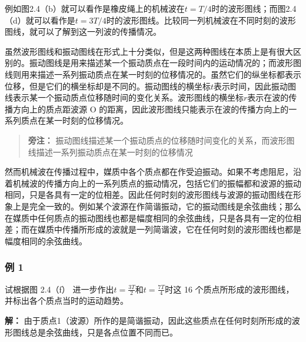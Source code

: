 例如图2.4（b）就可以看作是橡皮绳上的机械波在\(t = T / 4\)时的波形图线；而图2.4（d）就可以看作是\(t = 3T / 4\)时的波形图线。比较同一列机械波在不同时刻的波形图线，就可以了解到这一列波的传播情况。

虽然波形图线和振动图线在形式上十分类似，但是这两种图线在本质上是有很大区别的。振动图线是用来描述某一个振动质点在一段时间内的运动情况的；而波形图线则用来描述一系列振动质点在某一时刻的位移情况的。虽然它们的纵坐标都表示位移，但是它们的横坐标却是不同的。振动图线的横坐标\(t\)表示时间，因此振动图线表示某一个振动质点位移随时间的变化关系。波形图线的横坐标\(r\)表示在波的传播方向上的质点距波源
O
的距离，因此波形图线只能表示在波的传播方向上的一系列质点在某一时刻的位移情况。

\begin{quote}
\textbf{旁注：}
振动图线描述某一个振动质点的位移随时间变化的关系，而波形图线描述一系列振动质点在某一时刻的位移情况
\end{quote}

然而机械波在传播过程中，媒质中各个质点都在作受迫振动。如果不考虑阻尼，沿着机械波的传播方向上的一系列质点的振动情况，包括它们的振幅都和波源的振动相同，只是各具有一定的位相差。因此任何时刻的波形图线与波源的振动图线在形象上是完全一致的。例如某个波源在作简谐振动，它的振动图线是余弦曲线；那么在媒质中任何质点的振动图线也都是幅度相同的余弦曲线，只是各具有一定的位相差；而在媒质中传播所形成的波就是一列简谐波，它在任何时刻的波形图线也都是幅度相同的余弦曲线。

\subsubsection{例 1}\label{ux4f8b-1-1}

试根据图 2.4（f） 进一步作出\(t=\frac{3T}{2}\)和\(t=\frac{7T}{4}\)时这
16 个质点所形成的波形图线，并标出各个质点当时的运动趋势。

\textbf{解：}
由于质点1（波源）所作的是简谐振动，因此这些质点在任何时刻所形成的波形图线总是余弦曲线，只是各点位置不同而已。

